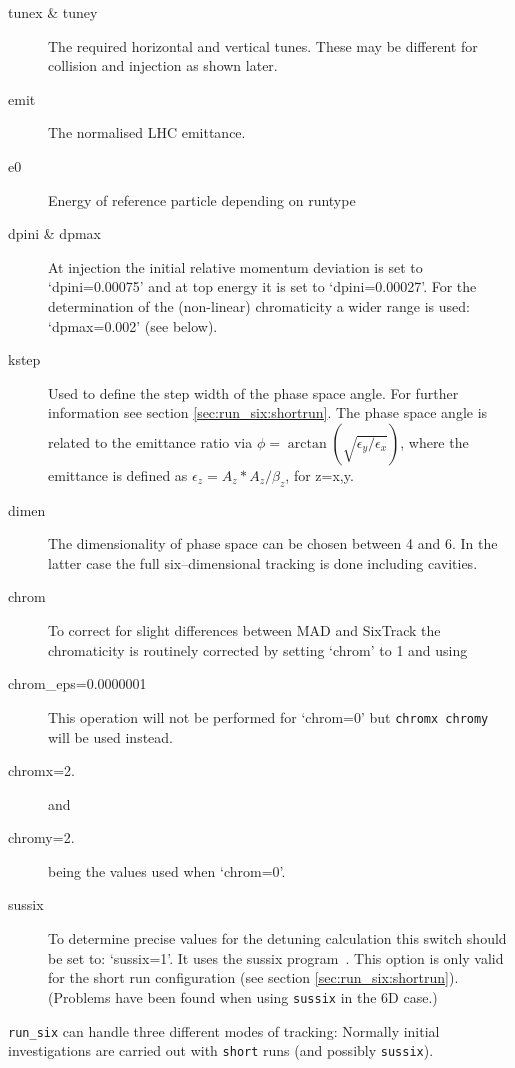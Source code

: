 \documentclass{cernatsnote}    %
\begin{document}
\begin{description}
\item [tunex \& tuney] The required horizontal and vertical tunes.
These may be different for collision and injection as shown later.
\item [emit] The normalised LHC emittance.
\item [e0] Energy of reference particle depending on runtype
\item [dpini \& dpmax]
  At injection the initial relative momentum deviation is set to
  `dpini=0.00075' and at top energy it is set to `dpini=0.00027'.
  For the determination of the (non-linear) chromaticity a 
  wider range is used: `dpmax=0.002' (see below).
\item [kstep]
  Used to define the step width of the phase space angle. For
  further information see section \ref{sec:run_six:shortrun}. The
  phase space angle is related
  to the emittance ratio via 
  $\phi=\arctan\left(\sqrt{{\epsilon_y}/{\epsilon_x}}\right)$,
  where the emittance is defined as
  $\epsilon_z=A_z*A_z/\beta_z$,
  for z=x,y.
\item [dimen]
  The dimensionality of phase space can be chosen between 4 and 6. In
  the latter case the full six--dimensional tracking is done including
  cavities.
\item [chrom]
  To correct for slight differences between MAD and SixTrack the
  chromaticity is routinely corrected by setting `chrom' to 1 and using
\item[chrom\_eps=0.0000001] This operation will not be performed for 
`chrom=0' but {\tt chromx chromy} will be used instead. 
\item[chromx=2.] and
\item[chromy=2.] being the values used when `chrom=0'.

\item [sussix]
  To determine precise values for the detuning calculation this switch
  should be set to: `sussix=1'. It uses the sussix
  program~\cite{lines3}. This option is only valid for the short run
  configuration (see section \ref{sec:run_six:shortrun}).
  (Problems have been found when using {\tt sussix} in the 6D case.)
\end{description}

{\tt run\_six} can handle three different modes of tracking:
Normally initial investigations are carried out with {\tt short}
runs (and possibly {\tt sussix}).
\end{document}
